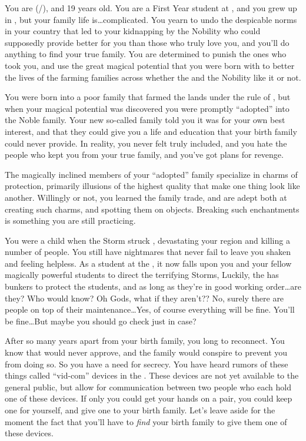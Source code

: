 \documentclass[char]{GL2020}
\begin{document}
\name{\cAdopted{}}

You are \cAdopted{} (\cAdopted{\they}/\cAdopted{\them}), and 19 years old. You are a First Year student at \pSchool{}, and you grew up in \pFarm{}, but your family life is\ldots complicated.  You yearn to undo the despicable norms in your country that led to your kidnapping by the Nobility who could supposedly provide better for you than those who truly love you, and you'll do anything to find your true family.  You are determined to punish the ones who took you, and use the great magical potential that you were born with to better the lives of the farming families across \pFarm{} whether the \cQueen{\Majesty} and the Nobility like it or not.

You were born into a poor family that farmed the lands under the rule of \cAdoptedParentOne{}, but when your magical potential was discovered you were promptly ``adopted'' into the Noble family.  Your new so-called family told you it was for your own best interest, and that they could give you a life and education that your birth family could never provide.  In reality, you never felt truly included, and you hate the people who kept you from your true family, and you've got plans for revenge.

The magically inclined members of your ``adopted'' family specialize in charms of protection, primarily illusions of the highest quality that make one thing look like another. Willingly or not, you learned the family trade, and are adept both at creating such charms, and spotting them on objects. Breaking such enchantments is something you are still practicing.

You were a child when the Storm struck \pFarm{}, devastating your region and killing a number of people.  You still have nightmares that never fail to leave you shaken and feeling helpless.  As a student at the \pSchool{}, it now falls upon you and your fellow magically powerful students to direct the terrifying Storms, Luckily, the \pSchool{} has bunkers to protect the students, and as long as they're in good working order\ldots are they?  Who would know?  Oh Gods, what if they aren't??  No, surely there are people on top of their maintenance\ldots Yes, of course everything will be fine.  You'll be fine\ldots But maybe you should go check just in case?

After so many years apart from your birth family, you long to reconnect. You know that \cAdoptedParentOne{} would never approve, and the family would conspire to prevent you from doing so. So you have a need for secrecy. You have heard rumors of these things called ``vid-com'' devices in the \pTech{}. These devices are not yet available to the general public, but allow for communication between two people who each hold one of these devices. If only you could get your hands on a pair, you could keep one for yourself, and give one to your birth family. Let's leave aside for the moment the fact that you'll have to \emph{find} your birth family to give them one of these devices.
\end{document}
